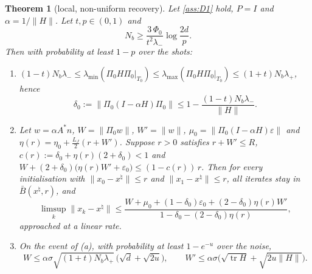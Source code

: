 \documentclass[11pt]{article}
\newtheorem{theorem}{Theorem}[section]
\theoremstyle{definition}
\theoremstyle{remark}
\newcommand{\norm}[1]{\lVert #1\rVert}
\newcommand{\tr}{\operatorname{tr}}
\newcommand{\lmin}{\lambda_{\min}}
\newcommand{\lmax}{\lambda_{\max}}
\newcommand{\xt}{x^\natural}
\begin{document}
\begin{theorem}[local, non-uniform recovery]\label{thm:local}
Let \cref{ass:D1} hold, $P=I$ and $\alpha=1/\norm H$. Let $t,p\in(0,1)$ and
\begin{equation}\label{eq:Nb}
N_b\geq\frac{3\,\Phi_0}{t^2\lambda_-}\log\frac{2d}{p}.
\end{equation}
Then with probability at least $1-p$ over the shots:
\begin{enumerate}
\item[(a)] $(1-t)N_b\lambda_-\leq\lmin(\Pi_0H\Pi_0|_{T_0})\leq\lmax(\Pi_0H\Pi_0|_{T_0})\leq(1+t)N_b\lambda_+$, hence
  \[
  \delta_0:=\norm{\Pi_0(I-\alpha H)\Pi_0}\leq1-\frac{(1-t)N_b\lambda_-}{\norm H}.
  \]
\item[(b)] Let $w=\alpha A^*n$, $W=\norm{\Pi_0w}$, $W'=\norm w$, $\mu_0=\norm{\Pi_0(I-\alpha H)\varepsilon}$ and
  $\eta(r)=\eta_0+\frac{L_J}{2}(r+W')$. Suppose $r>0$ satisfies $r+W'\leq R$,
  $c(r):=\delta_0+\eta(r)(2+\delta_0)<1$ and $W+(2+\delta_0)\big(\eta(r)W'+\varepsilon_0\big)\leq(1-c(r))\,r$.
  Then for every initialisation with $\norm{x_0-\xt}\leq r$ and $\norm{x_1-\xt}\leq r$, all iterates stay in
  $\bar B(\xt,r)$, and
  \[
  \limsup_k\norm{x_k-\xt}\leq\frac{W+\mu_0+(1-\delta_0)\varepsilon_0+(2-\delta_0)\eta(r)W'}{1-\delta_0-(2-\delta_0)\eta(r)},
  \]
  approached at a linear rate.
\item[(c)] On the event of (a), with probability at least $1-e^{-u}$ over the noise,
  \[
  W\leq\alpha\sigma\sqrt{(1+t)N_b\lambda_+}\,\big(\sqrt d+\sqrt{2u}\big),\qquad W'\leq\alpha\sigma\big(\sqrt{\tr H}+\sqrt{2u\norm H}\big).
  \]
\end{enumerate}
\end{theorem}
\end{document}
